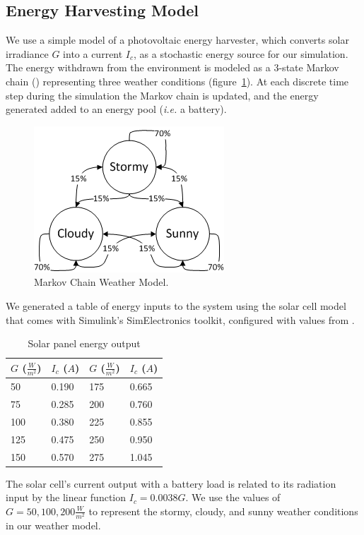 \subsection{Energy Harvesting Model}
We use a simple model of a photovoltaic energy harvester, which converts solar irradiance $G$ into a current $I_c$, as a stochastic energy source for our simulation.  The energy withdrawn from the environment is modeled as a 3-state Markov chain (\cite{poggi2000stochastic,moser2007real}) representing three weather conditions (figure~\ref{fig:markov}).  At each discrete time step during the simulation the Markov chain is updated, and the energy generated added to an energy pool (\emph{i.e.} a battery).
\begin{figure}[htb]
\begin{center}
\label{fig:markov}
\caption{Markov Chain Weather Model.}
\includegraphics[scale=0.8]{markov.png}
\end{center}
\end{figure}
We generated a table of energy inputs to the system using the solar cell model that comes with Simulink's SimElectronics toolkit, configured with values from \cite{gonzalez2006model}.  
\begin{table}[h]
\begin{center}
\begin{tabular}{| l | l || l | l |}
\hline
\textbf{$G$ ($\frac{W}{m^2}$)} & \textbf{$I_c$ ($A$)} & \textbf{$G$ ($\frac{W}{m^2}$)} & \textbf{$I_c$ ($A$)} \\
\hline
50 & 0.190 & 175 & 0.665 \\
75 & 0.285 & 200 & 0.760 \\
100 & 0.380 & 225 & 0.855 \\
125 & 0.475 & 250 & 0.950 \\
150 & 0.570 & 275 & 1.045 \\
\hline
\end{tabular}
\end{center}
\label{tab:radiance}
\caption{Solar panel energy output}
\end{table}
The solar cell's current output with a battery load is related to its radiation input by the linear function $I_c = 0.0038G$.  We use the values of $G = 50, 100, 200 \frac{W}{m^2}$ to represent the stormy, cloudy, and sunny weather conditions in our weather model.

